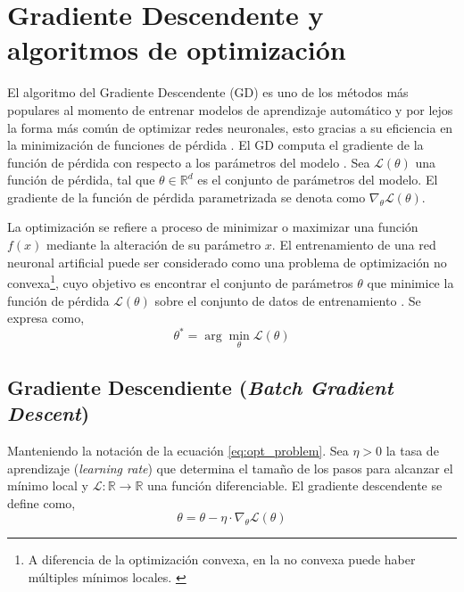 
\section{Gradiente Descendente y algoritmos de optimización}
El algoritmo del Gradiente Descendente (GD) es uno de los métodos más populares al momento de entrenar modelos de aprendizaje automático y por lejos la forma más común de optimizar redes neuronales, 
esto gracias a su eficiencia en la minimización de funciones de pérdida \cite{ruder2016overview}. El GD computa el gradiente de la función de pérdida con respecto a los parámetros del modelo \cite{rumelhart1986learning}. 
Sea $\mathcal{L}(\theta)$ una función de pérdida, tal que $\theta\in \mathbb{R}^d$ es el conjunto de parámetros del modelo. El gradiente de la función de pérdida parametrizada se denota como $\nabla_\theta \mathcal{L}(\theta)$.

La optimización se refiere a proceso de minimizar o maximizar una función $f(x)$ mediante la alteración de su parámetro $x$. El entrenamiento de una red neuronal artificial puede ser considerado como una problema de 
optimización no convexa\footnote{A diferencia de la optimización convexa, en la no convexa puede haber múltiples mínimos locales. \cite{fotopoulos2024reviewnonconvexoptimizationmethod}}, cuyo objetivo es encontrar el conjunto de parámetros $\theta$  
que minimice la función de pérdida $\mathcal{L}(\theta)$ sobre el conjunto de datos de entrenamiento \cite{goodfellow2016deep, andrychowicz2016learning}. Se expresa como, %
\begin{equation}
    \theta^* = \arg\min_{\theta} \mathcal{L}(\theta)
    \label{eq:opt_problem}
\end{equation}

\subsection{Gradiente Descendiente (\textit{Batch Gradient Descent})}
Manteniendo la notación de la ecuación \ref{eq:opt_problem}. Sea $\eta > 0 $ la tasa de aprendizaje (\textit{learning rate}) que determina el tamaño de los pasos para alcanzar el mínimo local y 
$\mathcal{L}:\mathbb{R}\rightarrow\mathbb{R}$ una función diferenciable. El gradiente descendente se define como,
\begin{equation}
    \theta = \theta - \eta \cdot\nabla_\theta \mathcal{L}(\theta)
    \label{eq:gd}
\end{equation}

